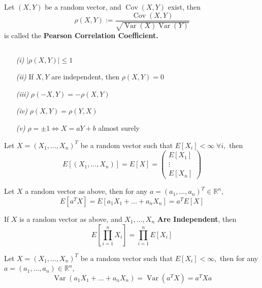 \documentclass{tufte-handout}
\DeclareMathOperator{\var}{Var}
\DeclareMathOperator{\cov}{Cov}
\begin{document}
\begin{definition}
  Let $(X,Y)$ be a random vector, and $\cov(X,Y)$ exist, then 
  $$ \rho(X,Y) :=\frac{\cov(X,Y)}{\sqrt{\var (X)\var (Y)} } $$
  is called the \textbf{Pearson Correlation Coefficient.}
  
\end{definition}
\begin{lemma}$  $\\
  \begin{enumerate}
    \item[\it (i)] $|\rho(X,Y)| \leq 1$
    \item[\it (ii)] If $X, Y$ are independent, then $\rho(X,Y) = 0$
    \item[\it (iii)] $\rho (-X, Y) = - \rho (X,Y)$
    \item[\it (iv)] $\rho (X,Y) = \rho (Y,X)$
    \item[\it (v)] $\rho = \pm 1 \iff X = aY + b$ almost surely
 
  \end{enumerate}
  
\end{lemma}
\begin{definition}
  Let $X = (X_1, ..., X_n)^T$ be a random vector such that $E[X_i]< \infty \; \forall i,$ then 
  $$E [(X_1, ..., X_n)] =E[X]= \begin{pmatrix}
    E[X_1] \\ 
    \vdots\\ 
    E[X_n]
  \end{pmatrix}   $$
  
\end{definition}
\begin{theorem} \label{label}
  Let $X$ a random vector as above, then for any $a = (a_1,..., a_n)^T \in \mathbb{R}^n$, 
  $$E[a^T X] = E[a_1X_1+ ... + a_n X_n] = a^T E[X] $$
\end{theorem}
\begin{theorem} \label{label}
  If $X$ is a random vector as above, and $X_1,..., X_n$ \textbf{Are Independent}, then$$E \left[\prod^{n}_{i=1} X_i \right]  = \prod^{n}_{i=1} E[X_i] $$
\end{theorem}
\begin{theorem} \label{label}
  Let $X = (X_1,...,X_n)^T$ be a random vector such that $E[X_i]< \infty,$ then for any $a = (a_1, ..., a_n) \in \mathbb{R}^n$, 
  $$\var (a_1 X_1+...+ a_n X_n) = \var(a^TX) = a^T X a $$
\end{theorem}
\end{document}

